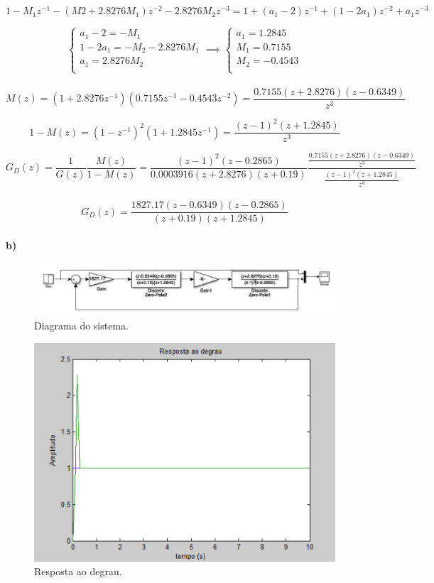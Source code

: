 \documentclass{article}
\begin{document}
    $$ 1 - M_1 z^{-1} - (M2 + 2.8276M_1) z^{-2} - 2.8276M_2 z^{-3} = 1 + (a_1 - 2)z^{-1} + (1 - 2a_1)z^{-2} + a_1 z^{-3} $$

    \[
        \begin{cases}
            a_1 - 2 = -M_1\\
            1 - 2a_1 = -M_2 - 2.8276M_1\\
            a_1 = 2.8276M_2\\
        \end{cases}
        \implies
        \begin{cases}
            a_1 = 1.2845\\
            M_1 = 0.7155\\
            M_2 = -0.4543\\
        \end{cases}
    \]\\

    $$ M(z) = (1+2.8276z^{-1})(0.7155z^{-1} - 0.4543z^{-2}) = \frac{ 0.7155(z+2.8276)(z-0.6349) }{ z^3 } $$

    $$ 1-M(z) = (1-z^{-1})^2 (1+ 1.2845 z^{-1}) = \frac{ (z-1)^2 (z + 1.2845) }{ z^3 } $$

    $$ G_{D}(z) = \frac{1}{G(z)} \frac{M(z)}{1-M(z)} = \frac{ (z-1)^2 (z-0.2865) }{ 0.0003916(z+2.8276)(z+0.19) } \frac{ \frac{ 0.7155(z+2.8276)(z-0.6349) }{ z^3 } }{ \frac{ (z-1)^2 (z + 1.2845) }{ z^3 } } $$\\[0.1cm]

    $$ G_{D}(z) = \frac{ 1827.17(z-0.6349)(z-0.2865) }{ (z+0.19)(z+1.2845) } $$\\[0.5cm]

    {\textbf{b)}}

    \begin{figure}[H]
       \centering
            \includegraphics[width=1\linewidth]{images/diagrama2b.png}
            \caption{Diagrama do sistema.}
            \label{fig:diagram2b}
    \end{figure}

    \begin{figure}[H]
       \centering
            \includegraphics[width=.7\linewidth]{images/grafico2b.png}
            \caption{Resposta ao degrau.}
            \label{fig:graph2b}
    \end{figure}
\end{document}

